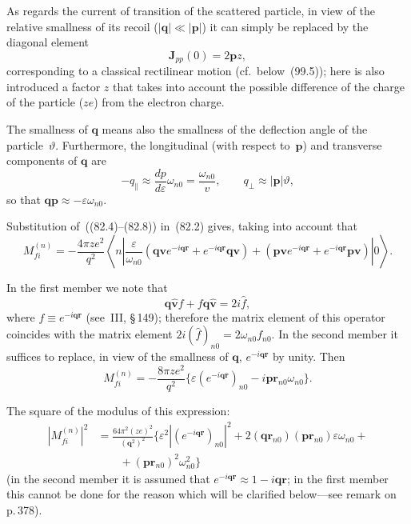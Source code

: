 As regards the current of transition of the scattered particle, in view of the relative smallness of its recoil ($|\mathbf{q}| \ll |\mathbf{p}|$) it can simply be replaced by the diagonal element
\begin{equation}
\mathbf{J}_{pp}(0) = 2\mathbf{p}z,
\tag{82.7}
\end{equation}
corresponding to a classical rectilinear motion (cf.\ below~(99.5)); here is also introduced a factor $z$ that takes into account the possible difference of the charge of the particle ($ze$) from the electron charge.

The smallness of $\mathbf{q}$ means also the smallness of the deflection angle of the particle~$\vartheta$. Furthermore, the longitudinal (with respect to~$\mathbf{p}$) and transverse components of $\mathbf{q}$ are
\begin{equation}
-q_\parallel \approx \frac{dp}{d\varepsilon}\omega_{n0} = \frac{\omega_{n0}}{v},\qquad q_\perp \approx |\mathbf{p}|\vartheta,
\tag{82.8}
\end{equation}
so that $\mathbf{q}\mathbf{p} \approx -\varepsilon\omega_{n0}$.

Substitution of~((82.4)--(82.8)) in~(82.2) gives, taking into account that
\[
M_{fi}^{(n)} = -\frac{4\pi ze^2}{q^2}\left\langle n\left|\frac{\varepsilon}{\omega_{n0}}(\mathbf{q}\mathbf{v}e^{-i\mathbf{qr}} + e^{-i\mathbf{qr}}\mathbf{q}\mathbf{v}) + (\mathbf{p}\mathbf{v}e^{-i\mathbf{qr}} + e^{-i\mathbf{qr}}\mathbf{p}\mathbf{v})\right|0\right\rangle.
\]

In the first member we note that
\[
\mathbf{q}\hat{\mathbf{v}}f + f\mathbf{q}\hat{\mathbf{v}} = 2i\hat{f},
\]
where $f \equiv e^{-i\mathbf{qr}}$ (see~III, \S\,149); therefore the matrix element of this operator coincides with the matrix element $2i(\hat{f})_{n0} = 2\omega_{n0}f_{n0}$. In the second member it suffices to replace, in view of the smallness of $\mathbf{q}$, $e^{-i\mathbf{qr}}$ by unity. Then
\[
M_{fi}^{(n)} = -\frac{8\pi ze^2}{q^2}\{\varepsilon(e^{-i\mathbf{qr}})_{n0} - i\mathbf{p}\mathbf{r}_{n0}\omega_{n0}\}.
\]

The square of the modulus of this expression:
\begin{equation}
\begin{split}
\left|M_{fi}^{(n)}\right|^2 &= \frac{64\pi^2(ze)^2}{(\mathbf{q}^2)^2}\bigg\{\varepsilon^2\left|(e^{-i\mathbf{qr}})_{n0}\right|^2 + 2(\mathbf{q}\mathbf{r}_{n0})(\mathbf{p}\mathbf{r}_{n0})\varepsilon\omega_{n0} +{}\\
&\qquad + (\mathbf{p}\mathbf{r}_{n0})^2\omega_{n0}^2\bigg\}
\end{split}
\tag{82.9}
\end{equation}
(in the second member it is assumed that $e^{-i\mathbf{qr}} \approx 1 - i\mathbf{qr}$; in the first member this cannot be done for the reason which will be clarified below---see remark on p.\,378).


